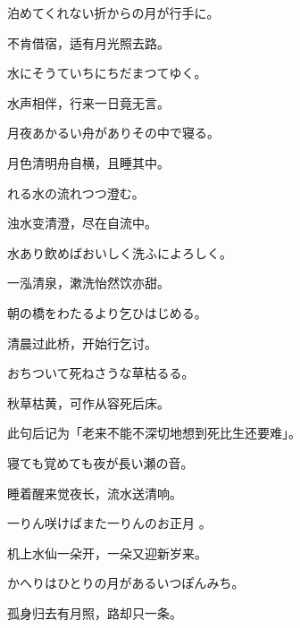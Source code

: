 \begin{haiku}
    {\FH 泊めてくれない折からの月が行手に。}

    {\FK 不肯借宿，适有月光照去路。}
\end{haiku}

\begin{haiku}
    {\FH 水にそうていちにちだまつてゆく。}

    {\FK 水声相伴，行来一日竟无言。}
\end{haiku}

\begin{haiku}
    {\FH 月夜あかるい舟がありその中で寝る。}

    {\FK 月色清明舟自横，且睡其中。}
\end{haiku}

\begin{haiku}
    {\FH {}れる水の流れつつ澄む。}

    {\FK 浊水变清澄，尽在自流中。}
\end{haiku}

\begin{haiku}
    {\FH 水あり飲めばおいしく洗ふによろしく。}

    {\FK 一泓清泉，漱洗怡然饮亦甜。}
\end{haiku}

\begin{haiku}
    {\FH 朝の橋をわたるより乞ひはじめる。}

    {\FK 清晨过此桥，开始行乞讨。}
\end{haiku}

\begin{haiku}
    {\FH おちついて死ねさうな草枯るる。}

    {\FK 秋草枯黄，可作从容死后床。}

    {\FS 此句后记为「老来不能不深切地想到死比生还要难」。}
\end{haiku}

\begin{haiku}
    {\FH 寝ても覚めても夜が長い瀬の音。}

    {\FK 睡着醒来觉夜长，流水送清响。}
\end{haiku}

\begin{haiku}
    {\FH 一りん咲けばまた一りんのお正月 。}

    {\FK 机上水仙一朵开，一朵又迎新岁来。}
\end{haiku}

\begin{haiku}
    {\FH かへりはひとりの月があるいつぽんみち。}

    {\FK 孤身归去有月照，路却只一条。}
\end{haiku}

